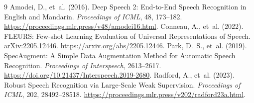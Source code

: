 \documentclass[12pt,a4paper]{report}
\begin{document}
\begin{thebibliography}{9}
Amodei, D., et~al. (2016). Deep Speech 2: End-to-End Speech Recognition in
English and Mandarin. \emph{Proceedings of ICML}, 48, 173--182.
\url{https://proceedings.mlr.press/v48/amodei16.html}.
Conneau, A., et~al. (2022). FLEURS: Few-shot Learning Evaluation of Universal
Representations of Speech. arXiv:2205.12446.
\url{https://arxiv.org/abs/2205.12446}.
Park, D.~S., et~al. (2019). SpecAugment: A Simple Data Augmentation Method
for Automatic Speech Recognition. \emph{Proceedings of Interspeech}, 2613--2617.
\url{https://doi.org/10.21437/Interspeech.2019-2680}.
Radford, A., et~al. (2023). Robust Speech Recognition via Large-Scale Weak
Supervision. \emph{Proceedings of ICML}, 202, 28492--28518.
\url{https://proceedings.mlr.press/v202/radford23a.html}.
\end{thebibliography}
\end{document}
